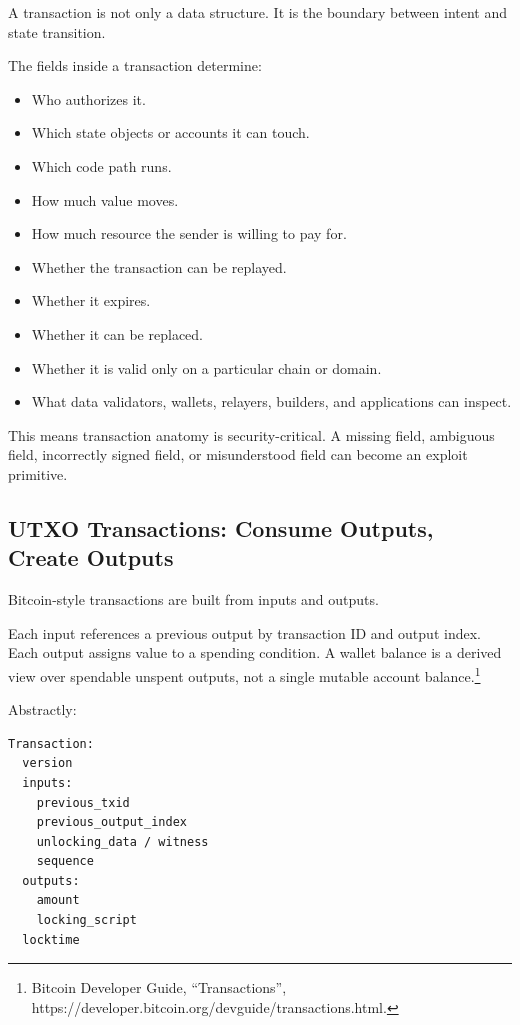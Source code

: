 A transaction is not only a data structure. It is the boundary between
intent and state transition.

The fields inside a transaction determine:

\begin{itemize}
\tightlist
\item
  Who authorizes it.
\item
  Which state objects or accounts it can touch.
\item
  Which code path runs.
\item
  How much value moves.
\item
  How much resource the sender is willing to pay for.
\item
  Whether the transaction can be replayed.
\item
  Whether it expires.
\item
  Whether it can be replaced.
\item
  Whether it is valid only on a particular chain or domain.
\item
  What data validators, wallets, relayers, builders, and applications
  can inspect.
\end{itemize}

This means transaction anatomy is security-critical. A missing field,
ambiguous field, incorrectly signed field, or misunderstood field can
become an exploit primitive.

\subsection{UTXO Transactions: Consume Outputs, Create Outputs}

Bitcoin-style transactions are built from inputs and outputs.

Each input references a previous output by transaction ID and output
index. Each output assigns value to a spending condition. A wallet
balance is a derived view over spendable unspent outputs, not a single
mutable account balance.\footnote{Bitcoin Developer Guide,
  ``Transactions'',
  https://developer.bitcoin.org/devguide/transactions.html.}

Abstractly:

\begin{lstlisting}
Transaction:
  version
  inputs:
    previous_txid
    previous_output_index
    unlocking_data / witness
    sequence
  outputs:
    amount
    locking_script
  locktime
\end{lstlisting}

